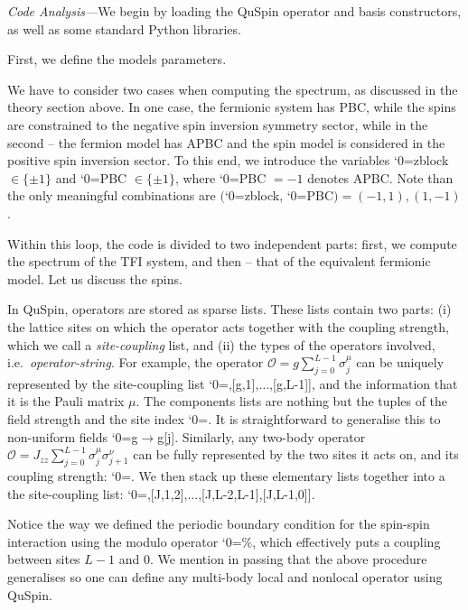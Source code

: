 \documentclass{SciPost}
\newcommand\0{\scalebox{-1}[1]{0}}
\let\svttfamily\ttfamily
\renewcommand\ttfamily{\svttfamily\catcode`0=\active }
\renewcommand\texttt{\bgroup\ttfamily\texttthelp}
\def\texttthelp#1{#1\egroup}
\newcommand{\JWcode}{example6.py}
\begin{document}
\noindent\emph{Code Analysis---}We begin by loading the QuSpin operator and basis constructors, as well as some standard Python libraries. 

First, we define the models parameters.

We have to consider two cases when computing the spectrum, as discussed in the theory section above. In one case, the fermionic system has PBC, while the spins are constrained to the negative spin inversion symmetry sector, while in the second -- the fermion model has APBC and the spin model is considered in the positive spin inversion sector. To this end, we introduce the variables \texttt{zblock} $\in\{\pm 1\}$ and \texttt{PBC} $\in\{\pm 1\}$, where \texttt{PBC} $=-1$ denotes APBC. Note than the only meaningful combinations are $($\texttt{zblock}, \texttt{PBC}$)=(-1,1),(1,-1)$.

Within this loop, the code is divided to two independent parts: first, we compute the spectrum of the TFI system, and then -- that of the equivalent fermionic model. Let us discuss the spins. 

In QuSpin, operators are stored as sparse lists. These lists contain two parts: (i) the lattice sites on which the operator acts together with the coupling strength, which we call a \emph{site-coupling} list, and (ii) the types of the operators involved, i.e.~\emph{operator-string}. For example, the operator $\mathcal{O}=g\sum_{j=0}^{L-1}\sigma^\mu_j$ can be uniquely represented by the site-coupling list \texttt{[[g,0],[g,1],$\dots$,[g,L-1]]}, and the information that it is the Pauli matrix $\mu$. The components lists are nothing but the tuples of the field strength and the site index \texttt{[g,j]}. It is straightforward to generalise this to non-uniform fields \texttt{g$\to $g[j]}. Similarly, any two-body operator $\mathcal{O}=J_{zz}\sum_{j=0}^{L-1}\sigma^\mu_j\sigma^\nu_{j+1}$ can be fully represented by the two sites it acts on, and its coupling strength: \texttt{[J,j,j+1]}. We then stack up these elementary lists together into a the site-coupling list: \texttt{[[J,0,1],[J,1,2],$\dots$,[J,L-2,L-1],[J,L-1,0]]}. 

Notice the way we defined the periodic boundary condition for the spin-spin interaction using the modulo operator \texttt{\%}, which effectively puts a coupling between sites $L-1$ and $0$. We mention in passing that the above procedure generalises so one can define any multi-body local and nonlocal operator using QuSpin. 
\end{document}
